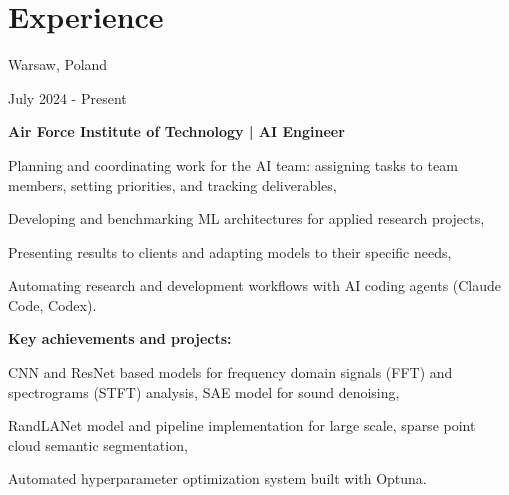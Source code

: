     \section{Experience}

    \begin{twocolentry}{
        Warsaw, Poland

        July 2024 - Present
    }
        \textbf{Air Force Institute of Technology | AI Engineer}
        \begin{highlights}
            \item Planning and coordinating work for the AI team: assigning tasks to team members, setting priorities, and tracking deliverables,
            \item Developing and benchmarking ML architectures for applied research projects,
            \item Presenting results to clients and adapting models to their specific needs,
            \item Automating research and development workflows with AI coding agents (Claude Code, Codex).
        \end{highlights}

        \vspace{0.2 cm}

        \textbf{Key achievements and projects:}
        \begin{highlights}
            \item CNN and ResNet based models for frequency domain signals (FFT) and spectrograms (STFT) analysis, SAE model for sound denoising,
            \item RandLANet model and pipeline implementation for large scale, sparse point cloud semantic segmentation,
            \item Automated hyperparameter optimization system built with Optuna.
        \end{highlights}
    \end{twocolentry}
    
    \vspace{0.2 cm}
    
